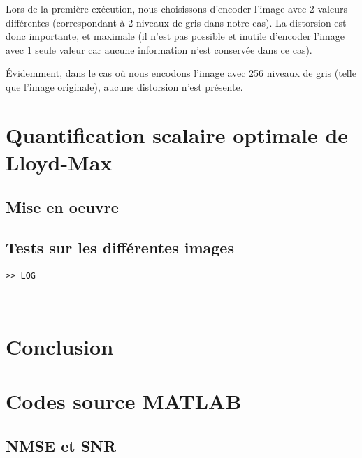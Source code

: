 \documentclass[a4paper, 12pt]{article}
\newcommand{\FSource}[1]{%

}
\begin{document}
Lors de la première exécution, nous choisissons d'encoder l'image avec 2 valeurs différentes (correspondant à 2 niveaux de gris dans notre cas). La distorsion est donc importante, et maximale (il n'est pas possible et inutile d'encoder l'image avec 1 seule valeur car aucune information n'est conservée dans ce cas).

Évidemment, dans le cas où nous encodons l'image avec 256 niveaux de gris (telle que l'image originale), aucune distorsion n'est présente.


\section{Quantification scalaire optimale de Lloyd-Max}

\subsection{Mise en oeuvre}



\subsection{Tests sur les différentes images}

\begin{verbatim}
>> LOG
\end{verbatim} \\

\newpage

\section{Conclusion}


\clearpage
\appendix

\section{Codes source MATLAB}
\subsection{NMSE et SNR}\label{nmse_snr_code}

\FSource{../disto_1_1.m}
\end{document}
